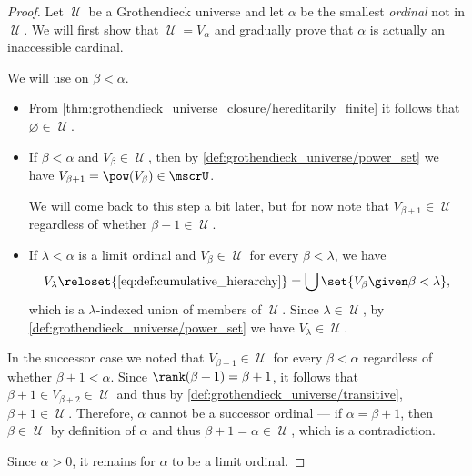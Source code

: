 \begin{proof}
  \NecessitySubProof Let \( \mscrU \) be a Grothendieck universe and let \( \alpha \) be the smallest \emph{ordinal} not in \( \mscrU \). We will first show that \( \mscrU = V_\alpha \) and gradually prove that \( \alpha \) is actually an inaccessible cardinal.

   We will use  on \( \beta < \alpha \).
  \begin{itemize}
    \item From \cref{thm:grothendieck_universe_closure/hereditarily_finite} it follows that \( \varnothing \in \mscrU \).

    \item If \( \beta < \alpha \) and \( V_\beta \in \mscrU \), then by \ref{def:grothendieck_universe/power_set} we have \( V_{\beta + 1} = \pow(V_\beta) \in \mscrU \).

    We will come back to this step a bit later, but for now note that \( V_{\beta + 1} \in \mscrU \) regardless of whether \( \beta + 1 \in \mscrU \).

    \item If \( \lambda < \alpha \) is a limit ordinal and \( V_\beta \in \mscrU \) for every \( \beta < \lambda \), we have
    \begin{equation*}
      V_\lambda
      \reloset {\eqref{eq:def:cumulative_hierarchy}} =
      \bigcup\set{ V_\beta \given \beta < \lambda },
    \end{equation*}
    which is a \( \lambda \)-indexed union of members of \( \mscrU \). Since \( \lambda \in \mscrU \), by \ref{def:grothendieck_universe/power_set} we have \( V_\lambda \in \mscrU \).
  \end{itemize}

   In the successor case we noted that \( V_{\beta + 1} \in \mscrU \) for every \( \beta < \alpha \) regardless of whether \( \beta + 1 < \alpha \). Since \( \rank(\beta + 1) = \beta + 1 \), it follows that \( \beta + 1 \in V_{\beta + 2} \in \mscrU \) and thus by \ref{def:grothendieck_universe/transitive}, \( \beta + 1 \in \mscrU \). Therefore, \( \alpha \) cannot be a successor ordinal --- if \( \alpha = \beta + 1 \), then \( \beta \in \mscrU \) by definition of \( \alpha \) and thus \( \beta + 1 = \alpha \in \mscrU \), which is a contradiction.

  Since \( \alpha > 0 \), it remains for \( \alpha \) to be a limit ordinal.


\end{proof}
